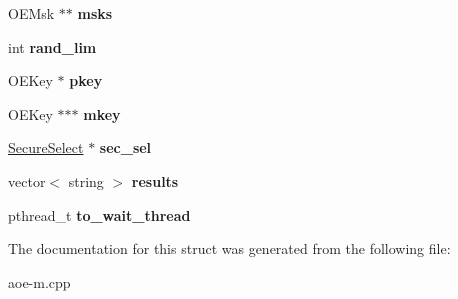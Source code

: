\begin{DoxyCompactItemize}
\item 
O\+E\+Msk $\ast$$\ast$ {\bfseries msks}\hypertarget{structthread__data_a93c970ea3b2b4d736ae68cae22b073b2}{}\label{structthread__data_a93c970ea3b2b4d736ae68cae22b073b2}

\item 
int {\bfseries rand\+\_\+lim}\hypertarget{structthread__data_a6cd60fc86b9e5fe882ae1d9745bb1a3c}{}\label{structthread__data_a6cd60fc86b9e5fe882ae1d9745bb1a3c}

\item 
O\+E\+Key $\ast$ {\bfseries pkey}\hypertarget{structthread__data_a57def2bfd78dc7c03a3096241a5fa387}{}\label{structthread__data_a57def2bfd78dc7c03a3096241a5fa387}

\item 
O\+E\+Key $\ast$$\ast$$\ast$ {\bfseries mkey}\hypertarget{structthread__data_a4eee52b5c15fed21e5670bd75fdf727d}{}\label{structthread__data_a4eee52b5c15fed21e5670bd75fdf727d}

\item 
\hyperlink{classSecureSelect}{Secure\+Select} $\ast$ {\bfseries sec\+\_\+sel}\hypertarget{structthread__data_accb6bab64d9749d50ab0e80f7f65f2fc}{}\label{structthread__data_accb6bab64d9749d50ab0e80f7f65f2fc}

\item 
vector$<$ string $>$ {\bfseries results}\hypertarget{structthread__data_a85af402928bace8d5b324fa82e6df04d}{}\label{structthread__data_a85af402928bace8d5b324fa82e6df04d}

\item 
pthread\+\_\+t {\bfseries to\+\_\+wait\+\_\+thread}\hypertarget{structthread__data_a5773525c826e3e3b89dd7f81a04394e1}{}\label{structthread__data_a5773525c826e3e3b89dd7f81a04394e1}

\end{DoxyCompactItemize}


The documentation for this struct was generated from the following file\+:\begin{DoxyCompactItemize}
\item 
aoe-\/m.\+cpp\end{DoxyCompactItemize}
